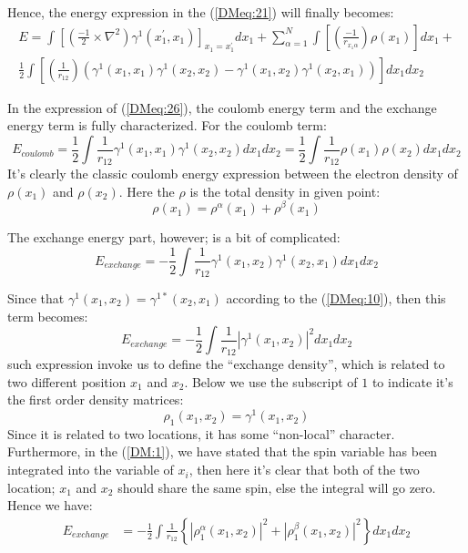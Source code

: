 Hence, the energy expression in the (\ref{DMeq:21}) will finally becomes:
\begin{multline}\label{DMeq:26}
  E = \int \left[\left(\frac{-1}{2}\times\nabla^2\right)
    \gamma^{1}(x^{'}_{1}, x_{1})\right]_{x_{1} = x_{1}^{'}} dx_{1} +
  \sum_{\alpha=1}^{N}\int
  \left[\left(\frac{-1}{r_{x_{1}\alpha}}\right) \rho(x_{1})\right]
  dx_{1} + \\
  \frac{1}{2}\int \left[\left(\frac{1}{r_{12}}\right)
    \left(\gamma^{1}(x_{1},x_{1})\gamma^{1}(x_{2},x_{2}) -
  \gamma^{1}(x_{1},x_{2})\gamma^{1}(x_{2},x_{1})\right)\right] dx_{1}dx_{2}
\end{multline}


In the expression of (\ref{DMeq:26}), the coulomb energy term and the
exchange energy term is fully characterized. For the coulomb term:
\begin{equation}
  \label{DMeq:30}
  E_{coulomb} =  \frac{1}{2}\int \frac{1}{r_{12}}
  \gamma^{1}(x_{1},x_{1})\gamma^{1}(x_{2},x_{2})dx_{1}dx_{2} =
  \frac{1}{2}\int \frac{1}{r_{12}} \rho(x_{1})\rho(x_{2})dx_{1}dx_{2}
\end{equation}
It's clearly the classic coulomb energy expression between the
electron density of $\rho(x_{1})$ and $\rho(x_{2})$. Here the $\rho$
is the total density in given point:
\begin{equation}
  \label{DMeq:31}
  \rho(x_{1}) = \rho^{\alpha}(x_{1}) + \rho^{\beta}(x_{1})
\end{equation}

The exchange energy part, however; is a bit of complicated:
\begin{equation}
  E_{exchange} =  -\frac{1}{2}\int \frac{1}{r_{12}}
  \gamma^{1}(x_{1},x_{2})\gamma^{1}(x_{2},x_{1})dx_{1}dx_{2}
\end{equation}

Since that $\gamma^{1}(x_{1},x_{2}) = \gamma^{1*}(x_{2},x_{1})$
according to the (\ref{DMeq:10}), then this term becomes:
\begin{equation}
  \label{DMeq:32}
  E_{exchange} =  -\frac{1}{2}\int \frac{1}{r_{12}}
  |\gamma^{1}(x_{1},x_{2})|^{2}dx_{1}dx_{2}
\end{equation}
such expression invoke us to define the ``exchange density'', which
is related to two different position $x_{1}$ and $x_{2}$. Below we use
the subscript of $1$ to indicate it's the first order density
matrices:
\begin{equation}\label{}
\rho_{1}(x_{1},x_{2}) = \gamma^{1}(x_{1},x_{2})
\end{equation}
Since it is related to two locations, it has some ``non-local''
character. Furthermore, in the (\ref{DM:1}), we have stated that the
spin variable has been integrated into the variable of $x_{i}$, then
here it's clear that both of the two location; $x_{1}$ and $x_{2}$
should share the same spin, else the integral will go zero. Hence we
have:
\begin{align}
  \label{DMeq:33}
  E_{exchange} &=  -\frac{1}{2}\int \frac{1}{r_{12}}
  \left\{|\rho^{\alpha}_{1}(x_{1},x_{2})|^{2} +
  |\rho^{\beta}_{1}(x_{1},x_{2})|^{2}\right\}dx_{1}dx_{2}
\end{align}

